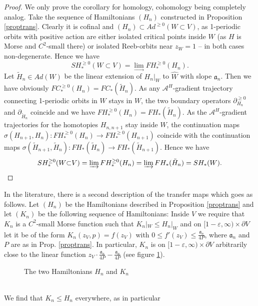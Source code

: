 \documentclass[a4paper,12pt,bibliography=totocnumbered,titlepage=false,abstracton,bookmarksnumbered=true]{scrartcl}
\newcommand{\veps}{\varepsilon}
\theoremstyle{definition}
\begin{document}
\begin{proof}
 We only prove the corollary for homology, cohomology being completely analog. Take the sequence of Hamiltonians $(H_n)$ constructed in Proposition \ref{proptrans}. Clearly it is cofinal and $(H_n)\subset Ad^{\geq0}(W{\subset}V)$, as 1-periodic orbits with positive action are either isolated critical points inside $W$ (as $H$ is Morse and $C^2$-small there) or isolated Reeb-orbits near $z_W=1$ -- in both cases non-degenerate. Hence we have
 \[ SH^{\geq0}_\ast(W{\subset}V)=\lim_{\longrightarrow} FH^{\geq0}_\ast(H_n).\]
 Let $\tilde{H}_n\in Ad(W)$ be the linear extension of $H_n|_W$ to $\widehat{W}$ with slope $\mathfrak{a}_n$. Then we have obviously $FC^{\geq0}_\ast(H_n)=FC_\ast(\tilde{H}_n)$. As any $\mathcal{A}^H$-gradient trajectory connecting 1-periodic orbits in $W$ stays in $W$, the two boundary operators $\partial_{H_n}^{\geq 0}$ and $\partial_{\tilde{H}_n}$ coincide and we have $FH^{\geq0}_\ast(H_n)=FH_\ast(\tilde{H}_n)$. As the $\mathcal{A}^H$-gradient trajectories for the homotopies $H_{n,n+1}$ stay inside $W$, the continuation maps $\sigma(H_{n+1},H_n): FH^{\geq0}_\ast(H_n)\rightarrow FH^{\geq0}_\ast(H_{n+1})$ coincide with the continuation maps $\sigma(\tilde{H}_{n+1},\tilde{H}_n): FH_\ast(\tilde{H}_n)\rightarrow FH_\ast(\tilde{H}_{n+1})$. Hence we have 
 \[SH^{\geq0}_\ast(W{\subset}V)= \varinjlim FH^{\geq0}_\ast(H_n) = \varinjlim FH_\ast(\tilde{H}_n)=SH_\ast(W).\qedhere\]
\end{proof}
In the literature, there is a second description of the transfer maps which goes as follows. Let $(H_n)$ be the Hamiltonians described in Proposition \ref{proptrans} and let $(K_n)$ be the following sequence of Hamiltonians: Inside $V$ we require that $K_n$ is a $C^2$-small Morse function such that $K_n|_W\leq H_n|_W$ and on $[1-\veps,\infty)\times\partial V$ let it be of the form $K_n(z_V,p)=f(z_V)$ with $0\leq f'(z_V)\leq\frac{\mathfrak{a}_n}{4P}$, where $\mathfrak{a}_n$ and $P$ are as in Prop. \ref{proptrans}. In particular, $K_n$ is on $[1{-}\veps,\infty)\times\partial V$ arbitrarily close to the linear function $z_V{\cdot}\frac{\mathfrak{a}_n}{4P}-\frac{\mathfrak{a}_n}{4P}$ (see figure \ref{figHam2nd}).\\
\begin{figure}[ht]
\centering
 \resizebox{15cm}{!}{}
 \caption{\label{figHam2nd}The two Hamiltonians $H_n$ and $K_n$}
\end{figure}\\
We find that $K_n\leq H_n$ everywhere, as in particular
\end{document}
